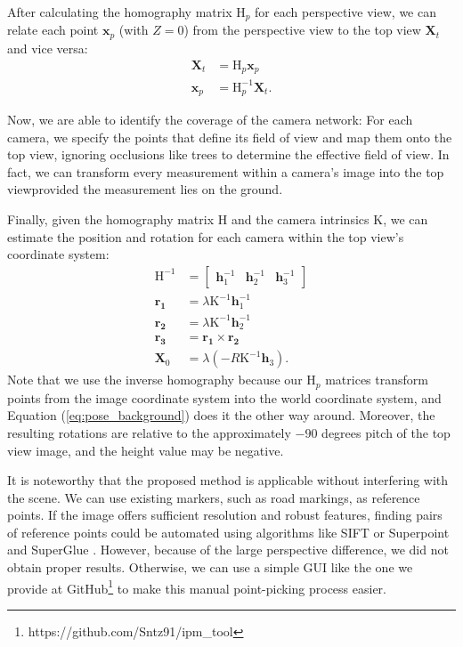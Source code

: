 After calculating the homography matrix $\mathrm{H}_p$ for 
each perspective view,
we can relate each point $\mathbf{x}_p$ (with $Z=0$) from the 
perspective view to the top view $\mathbf{X}_t$ and vice versa:
\begin{equation}
\begin{aligned}
	\mathbf{X}_t & = \mathrm{H}_p\mathbf{x}_p \\
	\mathbf{x}_p & = \mathrm{H}^{-1}_p\mathbf{X}_t.
\end{aligned}
\end{equation}

Now, we are able to identify the coverage of the camera network: For each camera, 
we specify the points that define its field of view and map them 
onto the top view, ignoring occlusions like trees to determine the effective  
field of view. In fact, we can transform every measurement within a 
camera's image into the top view\textemdash provided the measurement lies on 
the ground.

Finally, given the homography matrix $\mathrm{H}$ and the camera 
intrinsics $\mathrm{K}$, we can estimate the position and rotation for 
each camera within the top view's coordinate system:
\begin{equation}
\begin{aligned}
	\mathrm{H}^{-1} & = \begin{bmatrix} \mathbf{h}_1^{-1} & 
	\mathbf{h}_2^{-1} & \mathbf{h}_3^{-1} \end{bmatrix} \\
	\mathbf{r_1} & = \lambda\mathrm{K}^{-1}\mathbf{h}_1^{-1} \\ 
	\mathbf{r_2} & = \lambda\mathrm{K}^{-1}\mathbf{h}_2^{-1} \\ 
	\mathbf{r_3} & = \mathbf{r_1} \times \mathbf{r_2} \\ 
	\boldsymbol{X}_0 & = \lambda \left( {-R} \mathrm{K}^{-1} \mathbf{h}_3 \right).
\end{aligned}
\end{equation}
Note that we use the inverse homography because our $\mathrm{H}_p$ matrices
transform points from the image coordinate system into the world coordinate 
system, and Equation (\ref{eq:pose_background}) does it the other way 
around. Moreover, the resulting rotations are relative to the 
approximately $-90$ degrees pitch of the top view image, and the 
height value may be negative.

It is noteworthy that the proposed method is applicable without interfering 
with the scene. 
We can use existing markers, such as road markings, as reference points. 
If the image offers sufficient resolution and robust features, finding pairs 
of reference points 
could be automated using algorithms like SIFT \cite{lowe2004sift} 
or Superpoint \cite{detone2018superpoint} and 
SuperGlue \cite{sarlin2020superglue}. 
However, because of the large perspective difference, we did not obtain 
proper results. Otherwise, we can use a simple 
GUI like the one we provide at GitHub\footnote{https://github.com/Sntz91/ipm\_tool} to make this 
manual point-picking process easier.
